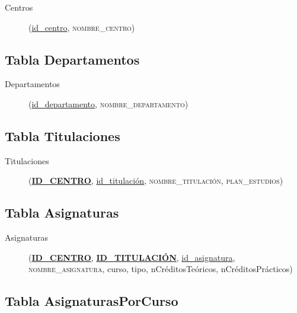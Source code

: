       \begin{description}
         \item[Centros] \begin{flushleft}(\underline{id\_centro},
         \textsc{nombre\_centro})\end{flushleft}
      \end{description}

   \subsection{Tabla Departamentos}

      \begin{description}
         \item[Departamentos] \begin{flushleft}(\underline{id\_departamento},
         \textsc{nombre\_departamento})\end{flushleft}
      \end{description}

   \subsection{Tabla Titulaciones}

      \begin{description}
         \item[Titulaciones] \begin{flushleft}(\underline{\textbf{ID\_CENTRO}},
         \underline{id\_titulación}, \textsc{nombre\_titulación},
         \textsc{plan\_estudios})\end{flushleft}
      \end{description}

   \subsection{Tabla Asignaturas}

      \begin{description}
         \item[Asignaturas] \begin{flushleft}(\underline{\textbf{ID\_CENTRO}},
         \underline{\textbf{ID\_TITULACIÓN}}, \underline{id\_asignatura},
         \textsc{nombre\_asignatura}, curso, tipo, nCréditosTeóricos,
         nCréditosPrácticos)\end{flushleft}
      \end{description}

   \subsection{Tabla AsignaturasPorCurso}

